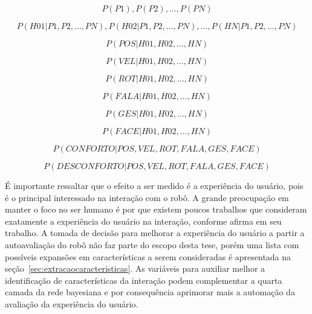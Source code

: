 \begin{equation}
	\label{eq:1}
	P(P1), P(P2), \dots, P(PN)
\end{equation}

\begin{equation}
	\label{eq:2}
	P(H01|P1, P2, \dots, PN), P(H02|P1, P2, \dots, PN), \dots, P(HN|P1, P2, \dots, PN)
\end{equation}

\begin{equation}
	\label{eq:3}
	P(POS|H01, H02, \dots, HN)
\end{equation}

\begin{equation}
	\label{eq:4}
	P(VEL|H01, H02, \dots, HN)
\end{equation}

\begin{equation}
	\label{eq:5}
	P(ROT|H01, H02, \dots, HN)
\end{equation}

\begin{equation}
	\label{eq:6}
	P(FALA|H01, H02, \dots, HN)
\end{equation}

\begin{equation}
	\label{eq:7}
	P(GES|H01, H02, \dots, HN)
\end{equation}

\begin{equation}
	\label{eq:8}
	P(FACE|H01, H02, \dots, HN)
\end{equation}

\begin{equation}
	\label{eq:9}
	P(CONFORTO|POS, VEL, ROT, FALA, GES, FACE)
\end{equation}

\begin{equation}
	\label{eq:10}
	P(DESCONFORTO|POS, VEL, ROT, FALA, GES, FACE)
\end{equation}

É importante ressaltar que o efeito a ser medido é a experiência do usuário, pois é o principal interessado na interação com o robô. A grande preocupação em manter o foco no ser humano é por que existem poucos trabalhos que consideram exatamente a experiência do usuário na interação, conforme  afirma em seu trabalho. A tomada de decisão para melhorar a experiência do usuário a partir a autoavaliação do robô não faz parte do escopo desta tese, porém uma lista com possíveis expansões em características a serem consideradas é apresentada na seção~\ref{sec:extracaocaracteristicas}. As variáveis para auxiliar melhor a identificação de características da interação podem complementar a quarta camada da rede bayesiana e por consequência aprimorar mais a automação da avaliação da experiência do usuário.

